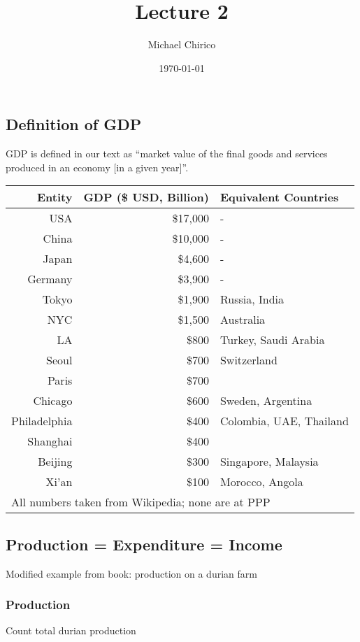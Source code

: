 \documentclass{article}
\begin{document}
\title{Lecture 2}
\author{Michael Chirico}
\date{\today}

\maketitle

\subsection*{Definition of GDP}
GDP is defined in our text as ``market value of the final goods and services produced in an economy [in a given year]''.

\begin{table}[h]
\centering
\begin{tabular}{|r|r|l|}
\hline
Entity & GDP (\$ USD, Billion) & Equivalent Countries \\
\hline
USA & \$17,000 & - \\
China & \$10,000 & - \\
Japan & \$4,600 & - \\
Germany & \$3,900 & - \\
Tokyo & \$1,900 & Russia, India \\
NYC & \$1,500 & Australia \\
LA & \$800 & Turkey, Saudi Arabia \\
Seoul & \$700 & Switzerland \\
Paris & \$700 &  \\
Chicago & \$600 & Sweden, Argentina \\
Philadelphia & \$400 & Colombia, UAE, Thailand \\
Shanghai & \$400 & \\
Beijing & \$300 & Singapore, Malaysia \\
Xi'an & \$100 & Morocco, Angola \\
\hline
\multicolumn{3}{l}{\scriptsize{All numbers taken from Wikipedia; none are at PPP}}
\end{tabular}
\end{table}

\subsection*{Production = Expenditure = Income}
Modified example from book: production on a durian farm

\subsubsection*{Production}
Count total durian production
\end{document}
